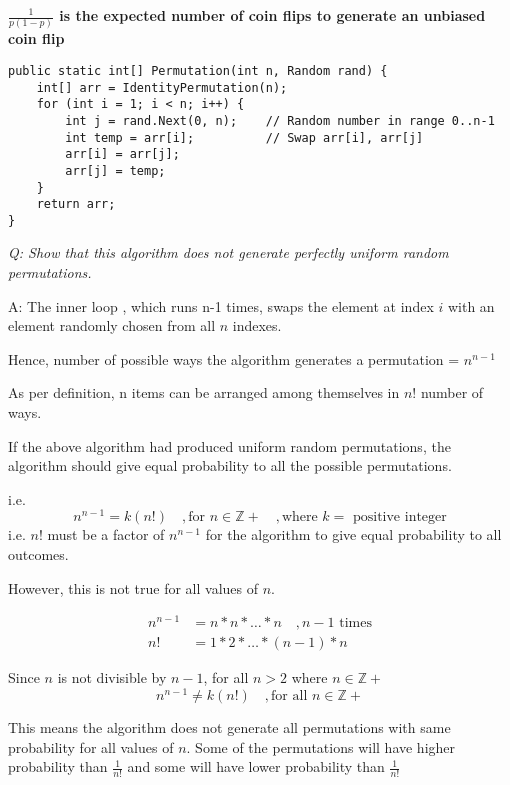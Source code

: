\documentclass{homeworg}
\begin{document}
\textbf{$\frac{1}{p(1-p)}$ is the expected number of coin flips to generate an unbiased coin flip}
\newpage

\exercise

\begin{verbatim}
public static int[] Permutation(int n, Random rand) {
    int[] arr = IdentityPermutation(n);
    for (int i = 1; i < n; i++) {
        int j = rand.Next(0, n);    // Random number in range 0..n-1
        int temp = arr[i];          // Swap arr[i], arr[j]
        arr[i] = arr[j];
        arr[j] = temp;
    }
    return arr;
}
\end{verbatim}

\emph{Q: Show that this algorithm does not generate perfectly uniform random permutations.}

A: The inner loop , which runs n-1 times, swaps the element at index $i$ with an element randomly chosen from all $n$ indexes.

Hence, number of possible ways the algorithm generates a permutation = $n^{n-1}$

As per definition, n items can be arranged among themselves in $n!$ number of ways.

If the above algorithm had produced uniform random permutations, the algorithm should give equal probability to all the possible permutations. 

i.e. 
\[
    n^{n-1} = k(n!)\quad, \text{for }n \in \mathbb{Z+}\quad, \text{where } k = \text{ positive integer}
\]
i.e. $n!$ must be a factor of $n^{n-1}$ for the algorithm to give equal probability to all outcomes.

However, this is not true for all values of $n$. 

\begin{equation*}
\begin{split}
    n^{n-1} &= n \ast n \ast \dots \ast n\quad, n-1\text{ times}\\
    n! &= 1 \ast 2 \ast \dots \ast (n-1) \ast n\quad
\end{split}
\end{equation*}

Since $n$ is not divisible by $n-1$, for all $n>2$ where $n \in \mathbb{Z+}$ 
\[n^{n-1} \ne k(n!) \quad, \text{for all } n \in \mathbb{Z+}\]

This means the algorithm does not generate all permutations with same probability for all values of $n$. Some of the permutations will have higher probability than $\frac{1}{n!}$ and some will have lower probability than $\frac{1}{n!}$
\end{document}
